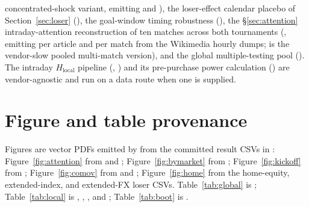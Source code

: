 \documentclass[12pt]{article}
\begin{document}
concentrated-shock variant, emitting  and ), the loser-effect calendar placebo of
Section~\ref{sec:loser} (), the goal-window timing robustness
(), the §\ref{sec:attention} intraday-attention
reconstruction of ten matches across both tournaments (, emitting
 per article and  per match from the
Wikimedia hourly dumps;  is the vendor-slow pooled multi-match version), and
the global multiple-testing pool (). The intraday
$H_{\text{local}}$ pipeline (, ) and
its pre-purchase power calculation () are vendor-agnostic and run on a data
route when one is supplied.

\section{Figure and table provenance}\label{app:figs}
Figures are vector PDFs emitted by  from the committed result CSVs in
: Figure~\ref{fig:attention} from  and
; Figure~\ref{fig:bymarket} from ;
Figure~\ref{fig:kickoff} from ; Figure~\ref{fig:comov} from 
and ; Figure~\ref{fig:home} from the home-equity, extended-index, and extended-FX
loser CSVs. Table~\ref{tab:global} is ; Table~\ref{tab:local} is
, , , and
; Table~\ref{tab:boot} is .
\end{document}

